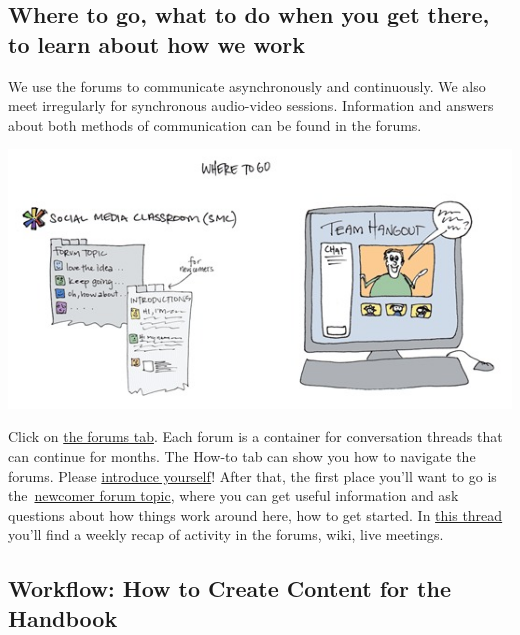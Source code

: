 \subsection{Where to go, what to do when you get there, to learn about
how we work}

We use the forums to communicate asynchronously and continuously. We
also meet irregularly for synchronous audio-video sessions. Information
and answers about both methods of communication can be found in the
forums.

\begin{center}
\href{http://peeragogy.org/wp-content/uploads/2012/03/where\_to\_go\_color.gif}{\includegraphics[width=.9\textwidth]{./pictures/where_to_go_color.jpg}}
\end{center}

Click on \href{http://socialmediaclassroom.com/host/peeragogy/forum}{the
forums tab}. Each forum is a container for conversation threads that can
continue for months. The How-to tab can show you how to navigate the
forums. Please
\href{http://socialmediaclassroom.com/host/peeragogy/forum/please-introduce-yourself}{introduce
yourself}! After that, the first place you'll want to go is
the~\href{http://socialmediaclassroom.com/host/peeragogy/forum/newcomers-start-here-welcome-center}{newcomer
forum topic}, where you can get useful information and ask questions
about how things work around here, how to get started. In
\href{http://socialmediaclassroom.com/host/peeragogy/forum/recaps-and-updates-forum-wiki-tools-handbook-activity}{this
thread} you'll find a weekly recap of activity in the forums, wiki, live
meetings.

\subsection{Workflow: How to Create Content for the Handbook}

